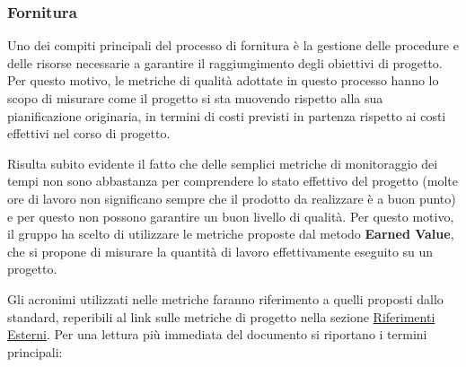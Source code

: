 \subsubsection{Fornitura}
Uno dei compiti principali del processo di fornitura è la gestione delle procedure e delle risorse necessarie a garantire il raggiungimento degli obiettivi di progetto. Per questo motivo, le metriche di qualità adottate in questo processo hanno lo scopo di misurare come il progetto si sta muovendo rispetto alla sua pianificazione originaria, in termini di costi previsti in partenza rispetto ai costi effettivi nel corso di progetto.
\par Risulta subito evidente il fatto che delle semplici metriche di monitoraggio dei tempi non sono abbastanza per comprendere lo stato effettivo del progetto (molte ore di lavoro non significano sempre che il prodotto da realizzare è a buon punto) e per questo non possono garantire un buon livello di qualità. Per questo motivo, il gruppo ha scelto di utilizzare le metriche proposte dal metodo \textbf{Earned Value}, che si propone di misurare la quantità di lavoro effettivamente eseguito su un progetto.
\par Gli acronimi utilizzati nelle metriche faranno riferimento a quelli proposti dallo standard, reperibili al link sulle metriche di progetto nella sezione \hyperref[sec:riferimenti_esterni]{Riferimenti Esterni}. Per una lettura più immediata del documento si riportano i termini principali:
